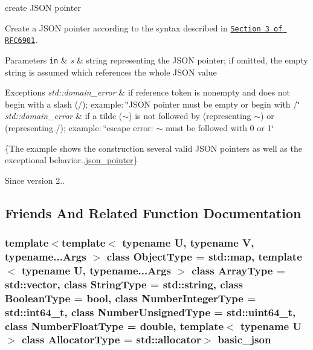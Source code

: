 create J\-S\-O\-N pointer 

Create a J\-S\-O\-N pointer according to the syntax described in \href{https://tools.ietf.org/html/rfc6901#section-3}{\tt Section 3 of R\-F\-C6901}.


\begin{DoxyParams}[1]{Parameters}
\mbox{\tt in}  & {\em s} & string representing the J\-S\-O\-N pointer; if omitted, the empty string is assumed which references the whole J\-S\-O\-N value\\
\hline
\end{DoxyParams}

\begin{DoxyExceptions}{Exceptions}
{\em std\-::domain\-\_\-error} & if reference token is nonempty and does not begin with a slash ({\ttfamily /}); example\-: {\ttfamily \char`\"{}\-J\-S\-O\-N pointer must be empty or
begin with /\char`\"{}} \\
\hline
{\em std\-::domain\-\_\-error} & if a tilde ({\ttfamily $\sim$}) is not followed by {} (representing {\ttfamily $\sim$}) or {} (representing {\ttfamily /}); example\-: {\ttfamily \char`\"{}escape error\-:
$\sim$ must be followed with 0 or 1\char`\"{}}\\
\hline
\end{DoxyExceptions}
\{The example shows the construction several valid J\-S\-O\-N pointers as well as the exceptional behavior.,\hyperlink{classnlohmann_1_1basic__json_1_1json__pointer}{json\-\_\-pointer}\}

\begin{DoxySince}{Since}
version 2.. 
\end{DoxySince}


\subsection{Friends And Related Function Documentation}
\hypertarget{classnlohmann_1_1basic__json_1_1json__pointer_a069a4f73a702f4c2bc0d14ca1565a7b0}{
\subsubsection[{basic\-\_\-json}]{\setlength{\rightskip}{0pt plus 5cm}template$<$template$<$ typename U, typename V, typename...\-Args $>$ class Object\-Type = std\-::map, template$<$ typename U, typename...\-Args $>$ class Array\-Type = std\-::vector, class String\-Type  = std\-::string, class Boolean\-Type  = bool, class Number\-Integer\-Type  = std\-::int64\-\_\-t, class Number\-Unsigned\-Type  = std\-::uint64\-\_\-t, class Number\-Float\-Type  = double, template$<$ typename U $>$ class Allocator\-Type = std\-::allocator$>$ {\bf basic\-\_\-json}\hspace{0.3cm}{\ttfamily [friend]}}}\label{classnlohmann_1_1basic__json_1_1json__pointer_a069a4f73a702f4c2bc0d14ca1565a7b0}


